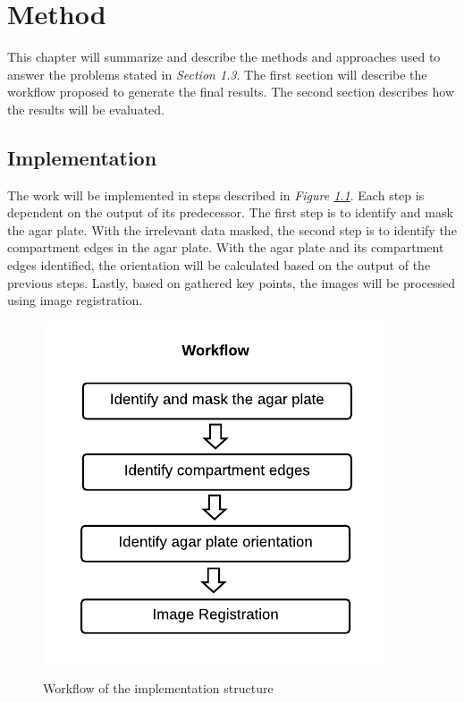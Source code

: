 

\chapter{Method}
This chapter will summarize and describe the methods and approaches used to answer the problems stated in \textit{Section 1.3}. The first section will describe the workflow proposed to generate the final results. The second section describes how the results will be evaluated.

\section{Implementation}
\noindent The work will be implemented in steps described in \textit{Figure \ref{fig:method workflow}}. Each step is dependent on the output of its predecessor. The first step is to identify and mask the agar plate. With the irrelevant data masked, the second step is to identify the compartment edges in the agar plate. With the agar plate and its compartment edges identified, the orientation will be calculated based on the output of the previous steps. Lastly, based on gathered key points, the images will be processed using image registration. \\

\begin{figure}[htbp]
    \centering
     \includegraphics[width=.43\linewidth]{figures/PDF/Workflow.pdf}\\
    \caption{Workflow of the implementation structure}
    \label{fig:method workflow}
\end{figure}

